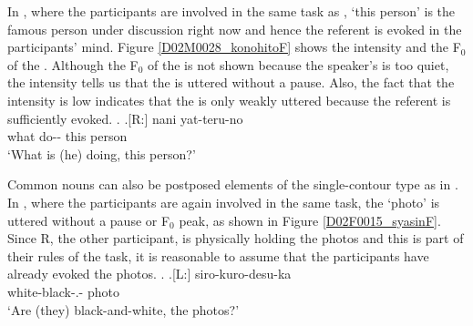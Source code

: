 In \Next,
where the participants are involved in the same task as \Last,
 `this person' is the famous person under discussion right now and hence the referent is evoked in the participants' mind.
Figure \ref{D02M0028_konohitoF} shows the intensity and the F$_{0}$ of the  \Next.
Although the F$_{0}$ of the  is not shown because the speaker's  is too quiet,
the intensity tells us that
the  is uttered without a pause.
Also, the fact that the intensity is low indicates that the  is only weakly uttered because the referent is sufficiently evoked.
%
\ex.\label{D02M0028_konohito}
	\ag.[R:] nani yat-teru-no   \\
			what do-- this person \\
			`What is (he) doing, this person?'

Common nouns can also be postposed elements of the single-contour type as in \Next.
In \Next, where the participants are again involved in the same task,
the   `photo' is uttered without a pause or F$_{0}$ peak, as shown in Figure \ref{D02F0015_syasinF}.
Since R, the other participant, is physically holding the photos and this is part of their rules of the task,
it is reasonable to assume that the participants have already evoked the photos.
%
\ex.\label{D02F0015_syasin}
	\ag.[L:] siro-kuro-desu-ka  \\
		white-black-.- photo \\
		`Are (they) black-and-white, the photos?'

